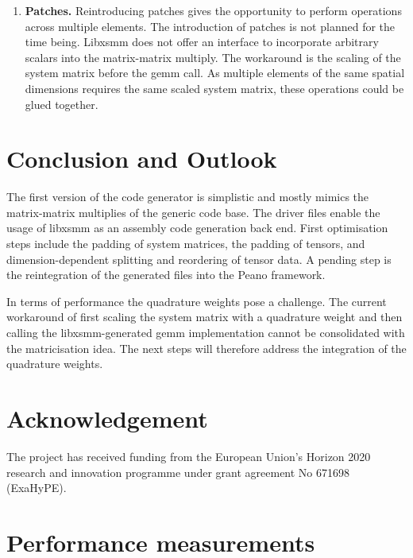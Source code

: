 \documentclass{acm_proc_article-sp}
\begin{document}
\begin{enumerate}
\item \textbf{Patches.} Reintroducing patches gives the opportunity to perform operations across multiple elements. The introduction of patches is not planned for the time being. Libxsmm does not offer an interface to incorporate arbitrary scalars into the matrix-matrix multiply. The workaround is the scaling of the system matrix before the gemm call. As multiple elements of the same spatial dimensions requires the same scaled system matrix, these operations could be glued together.
\end{enumerate}


\section{Conclusion and Outlook}
The first version of the code generator is simplistic and mostly mimics the matrix-matrix multiplies of the generic code base. The driver files enable the usage of libxsmm as an assembly code generation back end. First optimisation steps include the padding of system matrices, the padding of tensors, and dimension-dependent splitting and reordering of tensor data. A pending step is the reintegration of the generated files into the Peano framework.

In terms of performance the quadrature weights pose a challenge. The current workaround of first scaling the system matrix with a quadrature weight and then calling the libxsmm-generated gemm implementation cannot be consolidated with the matricisation idea. The next steps will therefore address the integration of the quadrature weights. 


\section{Acknowledgement}
The project has received funding from the European Union's Horizon 2020 
research and innovation programme under grant agreement No 671698
(ExaHyPE).

\pagebreak








\clearpage
\appendix
\section{Performance measurements} \label{App:Performance measurements}
\end{document}
